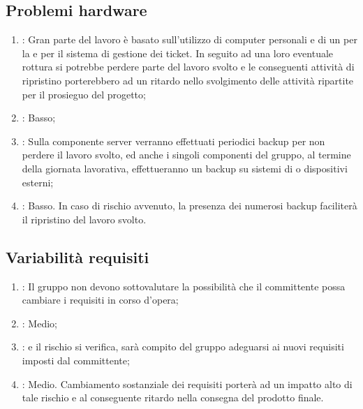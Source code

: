 \subsection{Problemi hardware}
\begin{enumerate}
\item {}: Gran parte del lavoro è basato sull'utilizzo di computer personali e di un  per la  e per il sistema di gestione dei ticket. In seguito ad una loro eventuale rottura si potrebbe perdere parte del lavoro svolto e le conseguenti attività di ripristino porterebbero ad un  ritardo nello svolgimento delle attività ripartite per il prosieguo del progetto;
\item {}: Basso;
\item {}: Sulla componente server verranno effettuati periodici backup per non perdere il lavoro svolto, ed anche i singoli componenti del gruppo, al termine della giornata lavorativa, effettueranno un backup su sistemi di  o dispositivi  esterni;
\item {}: Basso. In caso di rischio avvenuto, la presenza dei numerosi backup faciliterà il ripristino del lavoro svolto.
\end{enumerate}

\subsection{Variabilità requisiti}
\begin{enumerate}
\item {}: Il gruppo non devono sottovalutare la possibilità che il committente possa cambiare i requisiti in corso d'opera;
\item {}: Medio;
\item {}: e il rischio si verifica, sarà compito del gruppo adeguarsi ai nuovi requisiti imposti dal committente;
\item {}: Medio. Cambiamento sostanziale dei requisiti porterà ad un impatto alto di tale rischio e al conseguente ritardo nella consegna del prodotto finale.
\end{enumerate}

